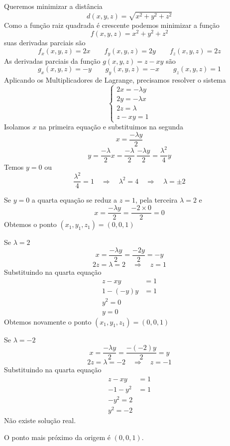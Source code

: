 \documentclass[a4paper,12pt,fleqn]{article}
\begin{document}
\begin{answer}
  Queremos minimizar a distância
  \[
    d(x, y, z) = \sqrt{x^2 + y^2 + z^2}
  \]
  Como a função raiz quadrada é crescente podemos minimizar a função
  \[
    f(x, y, z) = x^2 + y^2 + z^2
  \]
  suas derivadas parciais são
  \[
    f_x(x, y, z) = 2x
    \qquad
    f_y(x, y, z) = 2y
    \qquad
    f_z(x, y, z) = 2z
  \]
  As derivadas parciais da função \(g(x, y, z)=z-xy\) são
  \[
    g_x(x, y, z) = -y
    \qquad
    g_y(x, y, z) = -x
    \qquad
    g_z(x, y, z) = 1
  \]
  Aplicando os Multiplicadores de Lagrange, precisamos resolver o sistema
  \[
  \begin{cases}
    2x = -\lambda y \\
    2y = -\lambda x \\
    2z = \lambda  \\
    z-xy = 1
  \end{cases}
  \]
  Isolamos $x$ na primeira equação e substituimos na segunda
  \[
    x = \frac{-\lambda y}{2}
  \]
  \[
    y
    = \frac{-\lambda}{2} x
    = \frac{-\lambda}{2} \; \frac{-\lambda y}{2}
    = \frac{\lambda^2}{4} y
  \]
  Temos $y=0$ ou
  \[
    \frac{\lambda^2}{4} = 1
    \quad\Rightarrow\quad
    \lambda^2 = 4
    \quad\Rightarrow\quad
    \lambda = \pm 2
  \]

  Se $y=0$ a quarta equação se reduz a $z=1$, pela terceira \(\lambda=2\) e
  \[
    x
    = \frac{-\lambda y}{2}
    = \frac{-2\times 0}{2}
    = 0
  \]
  Obtemos o ponto \((x_1, y_1, z_1) = (0, 0, 1)\)

  \vspace{2\baselineskip}
  Se $\lambda=2$
  \[
    x
    = \frac{-\lambda y}{2}
    = \frac{-2y}{2}
    = -y
  \]
  \[
    2z = \lambda = 2
    \quad\Rightarrow\quad
    z = 1
  \]
  Substituindo na quarta equação
  \begin{align*}
    z-xy & = 1 \\
    1 - (-y)y & = 1 \\
    y^2 = 0 \\
    y = 0
  \end{align*}
  Obtemos novamente o ponto \((x_1, y_1, z_1) = (0, 0, 1)\)

  \vspace{2\baselineskip}
  Se $\lambda=-2$
  \[
    x
    = \frac{-\lambda y}{2}
    = \frac{-(-2)y}{2}
    = y
  \]
  \[
    2z = \lambda = -2
    \quad\Rightarrow\quad
    z = -1
  \]
  Substituindo na quarta equação
  \begin{align*}
    z-xy & = 1 \\
    -1 - y^2 & = 1 \\
    -y^2 = 2 \\
    y^2 = -2
  \end{align*}
  Não existe solução real.

  O ponto mais próximo da origem é \((0, 0, 1)\).
  \clearpage
\end{answer}
\end{document}
